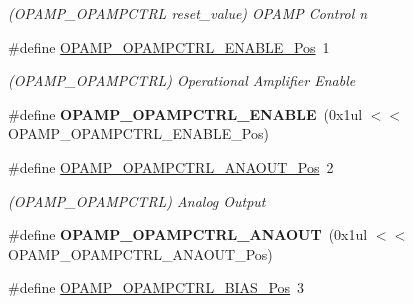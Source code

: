 \begin{DoxyCompactItemize}
\begin{DoxyCompactList}\small\item\em (O\+P\+A\+M\+P\+\_\+\+O\+P\+A\+M\+P\+C\+T\+R\+L reset\+\_\+value) O\+P\+A\+M\+P Control n \end{DoxyCompactList}\item 
\hypertarget{group___s_a_m_l21___o_p_a_m_p_ga6cfa4ea683465111e5d48679fdb121c4}{}\#define \hyperlink{group___s_a_m_l21___o_p_a_m_p_ga6cfa4ea683465111e5d48679fdb121c4}{O\+P\+A\+M\+P\+\_\+\+O\+P\+A\+M\+P\+C\+T\+R\+L\+\_\+\+E\+N\+A\+B\+L\+E\+\_\+\+Pos}~1\label{group___s_a_m_l21___o_p_a_m_p_ga6cfa4ea683465111e5d48679fdb121c4}

\begin{DoxyCompactList}\small\item\em (O\+P\+A\+M\+P\+\_\+\+O\+P\+A\+M\+P\+C\+T\+R\+L) Operational Amplifier Enable \end{DoxyCompactList}\item 
\hypertarget{group___s_a_m_l21___o_p_a_m_p_ga9aba24160845cf4c9e11e20c2ba68e09}{}\#define {\bfseries O\+P\+A\+M\+P\+\_\+\+O\+P\+A\+M\+P\+C\+T\+R\+L\+\_\+\+E\+N\+A\+B\+L\+E}~(0x1ul $<$$<$ O\+P\+A\+M\+P\+\_\+\+O\+P\+A\+M\+P\+C\+T\+R\+L\+\_\+\+E\+N\+A\+B\+L\+E\+\_\+\+Pos)\label{group___s_a_m_l21___o_p_a_m_p_ga9aba24160845cf4c9e11e20c2ba68e09}

\item 
\hypertarget{group___s_a_m_l21___o_p_a_m_p_ga4a941fc7efeb569ab15510f701db47e8}{}\#define \hyperlink{group___s_a_m_l21___o_p_a_m_p_ga4a941fc7efeb569ab15510f701db47e8}{O\+P\+A\+M\+P\+\_\+\+O\+P\+A\+M\+P\+C\+T\+R\+L\+\_\+\+A\+N\+A\+O\+U\+T\+\_\+\+Pos}~2\label{group___s_a_m_l21___o_p_a_m_p_ga4a941fc7efeb569ab15510f701db47e8}

\begin{DoxyCompactList}\small\item\em (O\+P\+A\+M\+P\+\_\+\+O\+P\+A\+M\+P\+C\+T\+R\+L) Analog Output \end{DoxyCompactList}\item 
\hypertarget{group___s_a_m_l21___o_p_a_m_p_ga90fde6a27d3028d34866b24d4c99f2a7}{}\#define {\bfseries O\+P\+A\+M\+P\+\_\+\+O\+P\+A\+M\+P\+C\+T\+R\+L\+\_\+\+A\+N\+A\+O\+U\+T}~(0x1ul $<$$<$ O\+P\+A\+M\+P\+\_\+\+O\+P\+A\+M\+P\+C\+T\+R\+L\+\_\+\+A\+N\+A\+O\+U\+T\+\_\+\+Pos)\label{group___s_a_m_l21___o_p_a_m_p_ga90fde6a27d3028d34866b24d4c99f2a7}

\item 
\hypertarget{group___s_a_m_l21___o_p_a_m_p_ga39618660caa87edecc46817bb1215e52}{}\#define \hyperlink{group___s_a_m_l21___o_p_a_m_p_ga39618660caa87edecc46817bb1215e52}{O\+P\+A\+M\+P\+\_\+\+O\+P\+A\+M\+P\+C\+T\+R\+L\+\_\+\+B\+I\+A\+S\+\_\+\+Pos}~3\label{group___s_a_m_l21___o_p_a_m_p_ga39618660caa87edecc46817bb1215e52}


\end{DoxyCompactItemize}
